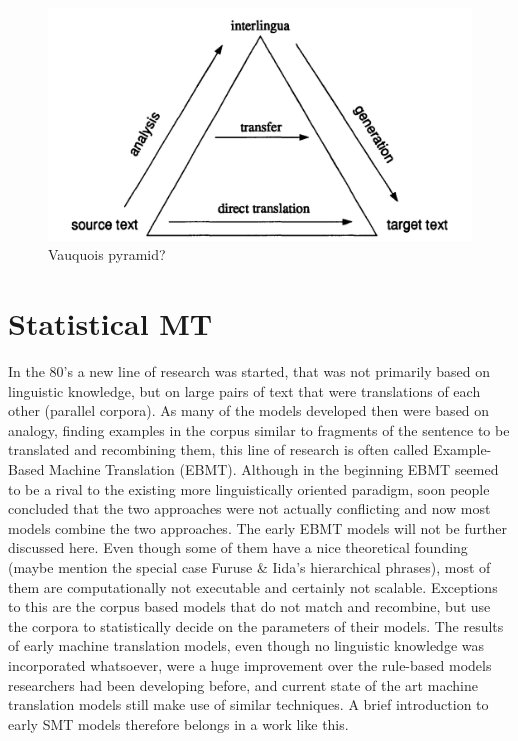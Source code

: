 \documentclass{report}
\theoremstyle{definition}
\theoremstyle{plain}
\begin{document}
\begin{figure}[!ht]
\includegraphics[scale=0.2]{translation_triangle.png}
\caption{Vauquois pyramid?}\label{fig:triangle}
\end{figure}

\section{Statistical MT}

In the 80's a new line of research was started, that was not primarily based on linguistic knowledge, but on large pairs of text that were translations of each other (parallel corpora). As many of the models developed then were based on analogy, finding examples in the corpus similar to fragments of the sentence to be translated and recombining them, this line of research is often called Example-Based Machine Translation (EBMT). Although in the beginning EBMT seemed to be a rival to the existing more linguistically oriented paradigm, soon people concluded that the two approaches were not actually conflicting and now most models combine the two approaches. The early EBMT models will not be further discussed here. Even though some of them have a nice theoretical founding (maybe mention the special case Furuse \& Iida's hierarchical phrases), most of them are computationally not executable and certainly not scalable. Exceptions to this are the corpus based models that do not match and recombine, but use the corpora to statistically decide on the parameters of their models. The results of early machine translation models, even though no linguistic knowledge was incorporated whatsoever, were a huge improvement over the rule-based models researchers had been developing before, and current state of the art machine translation models still make use of similar techniques. A brief introduction to early SMT models therefore belongs in a work like this.
\end{document}
